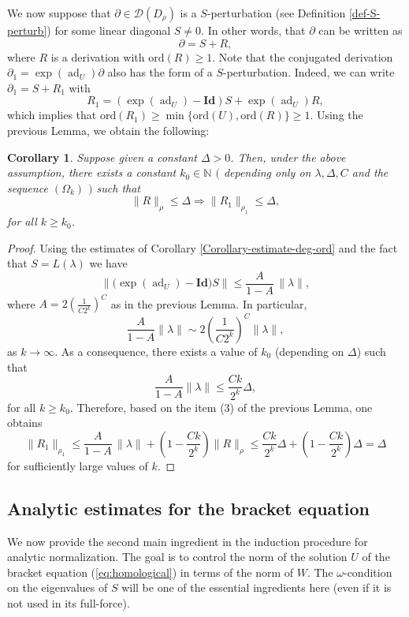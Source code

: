 \documentclass[10pt,twoside,reqno]{amsart}
\newtheorem{corollary}[thm]{Corollary}
\theoremstyle{remark}
\theoremstyle{remark}
\newcommand{\N}{\mathbb{N}}
\newcommand{\ad}{\operatorname{ad}}
\newcommand{\ord}{\mathrm{ord}}
\newcommand{\cD}{\mathcal{D}}
\begin{document}
We now suppose that $\partial \in \cD(D_\rho)$ is a $S$-perturbation (see Definition \ref{def-S-perturb}) for some linear diagonal $S\neq 0$. In other words, that $\partial$ can be written as
$$
\partial = S + R,
$$
where $R$ is a derivation with $\ord(R) \ge 1$. Note that the conjugated derivation $\partial_1 = \exp (\ad_U) \partial $ also has the form of a $S$-perturbation. Indeed, we can write $\partial_1 = S + R_1$  with
$$
R_1 = (\exp (\ad_U)-\mathbf{Id}) S + \exp (\ad_U) R,
$$
which implies that $\ord(R_1) \ge \min\{\ord(U),\ord(R)\} \ge 1$. Using the previous Lemma, we obtain the following: 
\begin{corollary}\label{corollary-to-lemma-expU}
Suppose given a constant $\Delta >0$. Then, under the above assumption, there exists a constant $k_0 \in \N$ $($ depending only on $\lambda,\Delta,C$ and the sequence $(\Omega_k)$ $)$ such that
$$
\| R \|_{\rho} \le \Delta \Rightarrow  \| R_1 \|_{\rho_1} \le \Delta,
$$
for all $k \ge k_0$. 
\end{corollary}
\begin{proof}
Using the estimates of Corollary \ref{Corollary-estimate-deg-ord} and the fact that $S = L(\lambda)$ we have
 \[
\left\| \bigl(\exp(\operatorname{ad}_U)-\mathbf{Id}\bigr) S  \right\|
\le
\frac{A}{1-A}\,\|\lambda\| ,
\]
where $A =2 \left( \frac{1}{C 2^k} \right)^C$ as in the previous Lemma. In particular, 
$$
\frac{A}{1-A} \|\lambda\| \sim 2 \left( \frac{1}{C 2^k} \right)^C \| \lambda \| ,
$$
as $k \rightarrow \infty$. As a consequence, there exists a value of $k_0$ (depending on $\Delta$) such that
$$
\frac{A}{1-A} \|\lambda\| \le \frac{C k}{2^k} \Delta,
$$
for all $k \ge k_0$. Therefore, based on the item (3) of the previous Lemma, one obtains
$$
\| R_1 \|_{\rho_1} \le \frac{A}{1-A}\,\|\lambda\| + \left( 1 - \frac{C k}{2^k} \right)  \| R \|_{\rho} \le \frac{C k}{2^k} \Delta + \left( 1 - \frac{C k}{2^k} \right) \Delta = \Delta
$$
for sufficiently large values of $k$. 
\end{proof}\subsection{Analytic estimates for the bracket equation}
We now provide the second main ingredient in the induction procedure for analytic normalization. The goal is to control the norm of the solution $U$ of the bracket equation (\ref{eq:homological}) in terms of the norm of $W$. The $\omega$-condition on the eigenvalues of $S$ will be one of the essential ingredients here (even if it is not used in its {full-force}).
\end{document}
